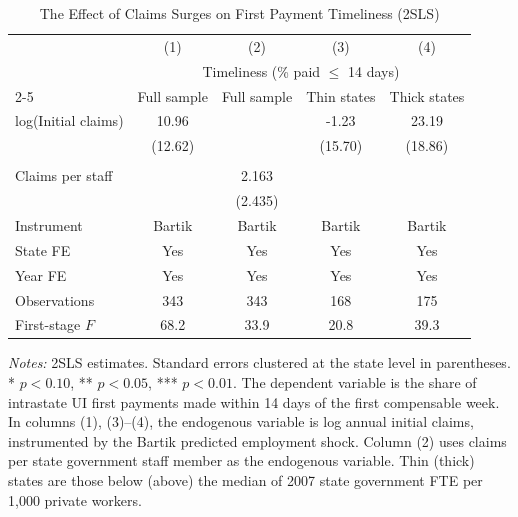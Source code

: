 \begin{table}[H]
\centering
\caption{The Effect of Claims Surges on First Payment Timeliness (2SLS)}
\begin{threeparttable}
\begin{tabular}{lcccc}
\toprule
 & (1) & (2) & (3) & (4) \\
 & \multicolumn{4}{c}{Timeliness (\% paid $\leq$ 14 days)} \\
\cmidrule(lr){2-5}
 & Full sample & Full sample & Thin states & Thick states \\
\midrule
log(Initial claims) & 10.96 & & -1.23 & 23.19 \\
 & (12.62) & & (15.70) & (18.86) \\
 & & & & \\
Claims per staff & & 2.163 & & \\
 & & (2.435) & & \\
\midrule
Instrument & Bartik & Bartik & Bartik & Bartik \\
State FE & Yes & Yes & Yes & Yes \\
Year FE & Yes & Yes & Yes & Yes \\
Observations & 343 & 343 & 168 & 175 \\
First-stage $F$ & 68.2 & 33.9 & 20.8 & 39.3 \\
\bottomrule
\end{tabular}
\begin{tablenotes}[flushleft]
\small
\item \textit{Notes:} 2SLS estimates. Standard errors clustered at the state level in parentheses. * $p<0.10$, ** $p<0.05$, *** $p<0.01$. The dependent variable is the share of intrastate UI first payments made within 14 days of the first compensable week. In columns (1), (3)--(4), the endogenous variable is log annual initial claims, instrumented by the Bartik predicted employment shock. Column (2) uses claims per state government staff member as the endogenous variable. Thin (thick) states are those below (above) the median of 2007 state government FTE per 1,000 private workers.
\end{tablenotes}
\end{threeparttable}
\label{tab:main}
\end{table}
